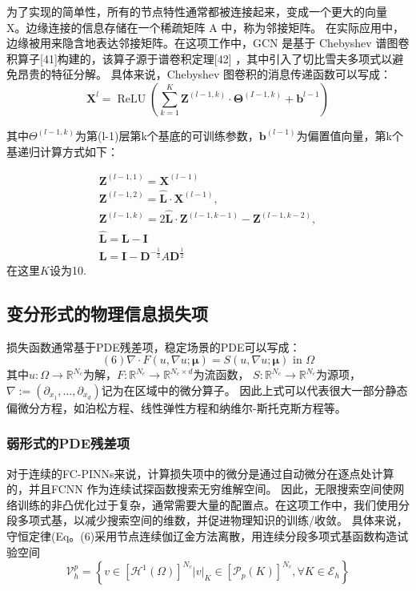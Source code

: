 为了实现的简单性，所有的节点特性通常都被连接起来，变成一个更大的向量 X。边缘连接的信息存储在一个稀疏矩阵 A 中，称为邻接矩阵。
在实际应用中，边缘被用来隐含地表达邻接矩阵。在这项工作中，GCN 是基于 Chebyshev 谱图卷积算子[41]构建的，该算子源于谱卷积定理[42] ，其中引入了切比雪夫多项式以避免昂贵的特征分解。
具体来说，Chebyshev 图卷积的消息传递函数可以写成：
$$\boldsymbol{X}^{l}=\operatorname{ReLU}\left(\sum_{k=1}^{K} \boldsymbol{Z}^{(l-1, k)} \cdot \boldsymbol{\Theta}^{(I-1, k)}+\boldsymbol{b}^{l-1}\right)$$

其中$\Theta^{(l-1, k)}$为第(l-1)层第k个基底的可训练参数，$\boldsymbol{b}^{(l-1)}$为偏置值向量，第k个基递归计算方式如下：

$$\begin{array}{l}
    \boldsymbol{Z}^{(l-1,1)}=\boldsymbol{X}^{(l-1)} \\
    \boldsymbol{Z}^{(l-1,2)}=\hat{\boldsymbol{L}} \cdot \boldsymbol{X}^{(l-1)}, \\
    \boldsymbol{Z}^{(l-1, k)}=2 \hat{\boldsymbol{L}} \cdot \boldsymbol{Z}^{(l-1, k-1)}-\boldsymbol{Z}^{(l-1, k-2)},\\
    \hat{\boldsymbol{L}}=\boldsymbol{L}-\boldsymbol{I}\\
    \boldsymbol{L}=\boldsymbol{I}-\boldsymbol{D}^{-\frac{1}{2}}A\boldsymbol{D}^{\frac{1}{2}}
    \end{array}$$
在这里$K$设为10.

\subsection{变分形式的物理信息损失项}
损失函数通常基于PDE残差项，稳定场景的PDE可以写成：
$$(6)\nabla \cdot F(u, \nabla u ; \boldsymbol{\mu})=S(u, \nabla u ; \boldsymbol{\mu}) \text { in } \Omega$$
其中$u: \Omega \rightarrow \mathbb{R}^{N_{c}}$为解，$F: \mathbb{R}^{N_{c}} \rightarrow \mathbb{R}^{N_{c} \times d}$为流函数，
$S: \mathbb{R}^{N_{c}} \rightarrow \mathbb{R}^{N_{c}}$为源项，$\nabla:=\left(\partial_{x_{1}}, \ldots, \partial_{x_{d}}\right)$记为在区域中的微分算子。
因此上式可以代表很大一部分静态偏微分方程，如泊松方程、线性弹性方程和纳维尔-斯托克斯方程等。

\subsubsection{弱形式的PDE残差项}
对于连续的FC-PINNs来说，计算损失项中的微分是通过自动微分在逐点处计算的，并且FCNN 作为连续试探函数搜索无穷维解空间。
因此，无限搜索空间使网络训练的非凸优化过于复杂，通常需要大量的配置点。在这项工作中，我们使用分段多项式基，以减少搜索空间的维数，并促进物理知识的训练/收敛。
具体来说，守恒定律(Eq。(6)采用节点连续伽辽金方法离散，用连续分段多项式基函数构造试验空间
$$\mathcal{V}_{h}^{p}=\left\{v \in\left[\mathcal{H}^{1}(\Omega)\right]^{N_{c}}|v|_{K} \in\left[\mathcal{P}_{p}(K)\right]^{N_{c}}, \forall K \in \mathcal{E}_{h}\right\}$$

